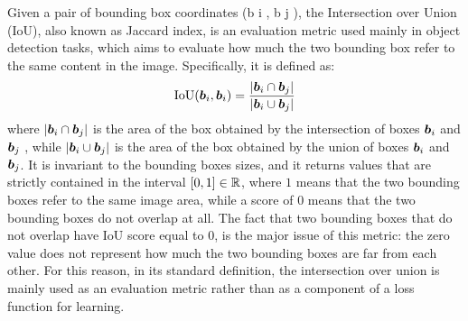 Given a pair of bounding box coordinates (b i , b j ), the
Intersection over Union (IoU), also known as Jaccard index, is an evaluation metric used mainly in object detection
tasks, which aims to evaluate how much the two bounding
box refer to the same content in the image. Specifically, it
is defined as:
\[
  \text{IoU}(\bm{b}_i, \bm{b}_i) = \frac{| \bm{b}_i \cap \bm{b}_j |}{| \bm{b}_i \cup \bm{b}_j |}
\]
where $| \bm{b}_i \cap \bm{b}_j |$ is the area of the box obtained by
the intersection of boxes $\bm{b}_i$ and $\bm{b}_j$ , while $| \bm{b}_i
\cup \bm{b}_j |$ is the area of the box obtained by the union of
boxes $\bm{b}_i$ and $\bm{b}_j$. It is invariant to the bounding boxes
sizes, and it returns values that are strictly contained in the
interval $[0, 1] \in \mathbb{R}$, where $1$ means that the two bounding
boxes refer to the same image area, while a score of $0$ means that
the two bounding boxes do not overlap at all. The fact that two
bounding boxes that do not overlap have IoU score equal to $0$, is the
major issue of this metric: the zero value does not represent how much
the two bounding boxes are far from each other. For this reason, in
its standard definition, the intersection over union is mainly used as
an evaluation metric rather than as a component of a loss function for
learning.
